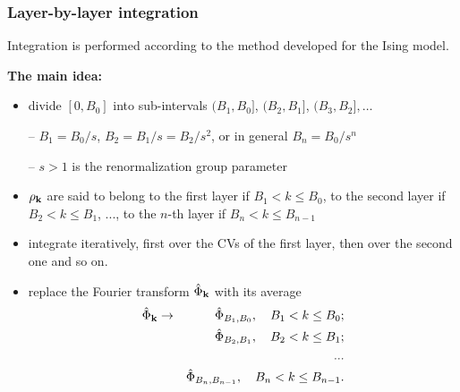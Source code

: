 \documentclass[8pt]{beamer}
\begin{document}
	\begin{frame}
		\frametitle{Layer-by-layer integration}
		Integration is performed according to the method developed for the Ising model.\\
		\hfill
		
		\textbf{The main idea:} 
		\begin{itemize}
			
		\item	divide $[0, B_0]$ into sub-intervals $(B_1, B_0]$, $(B_2, B_1]$, $(B_3, B_2], \ldots$
		
		-- $B_1 = B_0/s$, $B_2 = B_1/s = B_2/s^2$, or in general $B_n = B_0/s^n$
		
		-- $s > 1$ is the renormalization group parameter
		\hfill
		\\
		\hfill
		\item $\rho_{\vb k}$ are said to belong to the first layer if $B_1 < k \leq B_0$,		
		to the second layer if $B_2 < k \leq B_1$, ..., to the $n$-th layer if $B_n < k \leq B_{n-1}$
		\hfill
		\\
		\hfill
		\item integrate iteratively, first over the CVs of the first layer, then over the second one and so on.
		
		\hfill
		
		\item replace the Fourier transform $\hat{\Phi}_{\vb k}$ with its average
		\begin{eqnarray*}
			\hat{\Phi}_{\vb k} & \rightarrow & \hat{\Phi}_{B_1, B_0}, \quad B_1 < k \leq B_0;
			\\
			& & \hat{\Phi}_{B_2, B_1}, \quad B_2 < k \leq B_1;
			\\
			& & ...
			\\
			& & \hat{\Phi}_{B_n, B_{n-1}}, \quad B_n < k \leq B_{n-1}.
		\end{eqnarray*}
		
		\end{itemize}
		
	\end{frame}
	
\end{document}
